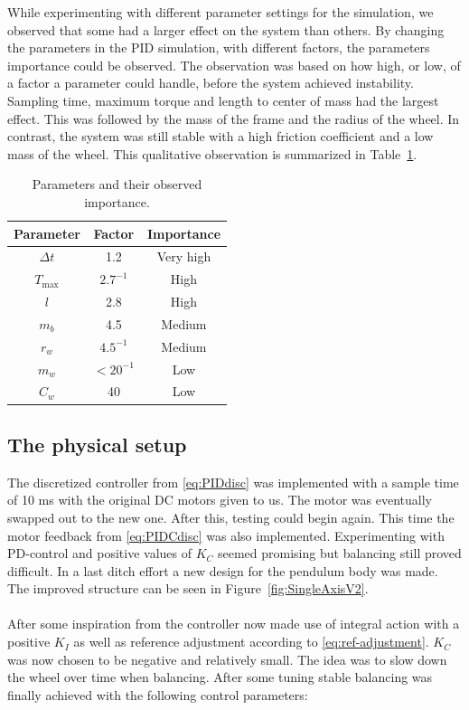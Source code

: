 \noindent
While experimenting with different parameter settings for the simulation, we observed that some had a larger effect on the system than others. By changing the parameters in the PID simulation, with different factors, the parameters importance could be observed. The observation was based on how high, or low, of a factor a parameter could handle, before the system achieved instability. Sampling time, maximum torque and length to center of mass had the largest effect. This was followed by the mass of the frame and the radius of the wheel. In contrast, the system was still stable with a high friction coefficient and a low mass of the wheel. This qualitative observation is summarized in Table~\ref{table:ParamSig}.

\begin{table}[H]
    \centering
    \begin{tabular}{ccc}\toprule
            Parameter  & Factor & Importance \\\midrule
            $\Delta t$        & 1.2         & Very high\\
            $T_{\text{max}}$  & $2.7^{-1}$  & High\\
            $l$               & 2.8         & High\\
            $m_b$             & 4.5         & Medium\\
            $r_{w}$           & $4.5^{-1}$  & Medium\\
            $m_{w}$           & $< 20^{-1}$ & Low\\
            $C_{w}$           &  40         & Low\\\bottomrule
    \end{tabular}
    \caption{Parameters and their observed importance.}
    \label{table:ParamSig}
\end{table}

\subsection{The physical setup}
The discretized controller from \eqref{eq:PIDdisc} was implemented with a sample time of 10 ms with the original DC motors given to us. The motor was eventually swapped out to the new one\cite{motor-datasheet}. After this, testing could begin again. This time the motor feedback from \eqref{eq:PIDCdisc} was also implemented. Experimenting with PD-control and positive values of $K_C$ seemed promising but balancing still proved difficult. In a last ditch effort a new design for the pendulum body was made. The improved structure can be seen in Figure~\ref{fig:SingleAxisV2}.
\\\\
After some inspiration from\cite{LEGO-video} the controller now made use of integral action with a positive $K_I$ as well as reference adjustment according to \eqref{eq:ref-adjustment}. $K_C$ was now chosen to be negative and relatively small. The idea was to slow down the wheel over time when balancing. After some tuning stable balancing was finally achieved with the following control parameters:

